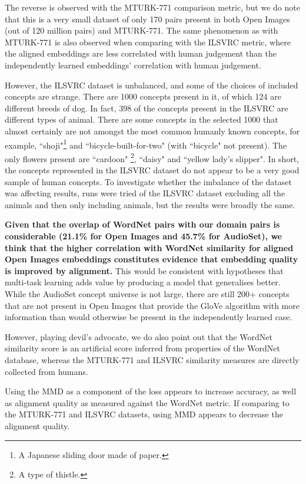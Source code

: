 The reverse is observed with the MTURK-771 comparison metric, but we do note that this is a very small dataset of only 170 pairs present in both Open Images (out of 120 million pairs) and MTURK-771. The same phenomenon as with MTURK-771 is also observed when comparing with the ILSVRC metric, where the aligned embeddings are less correlated with human judgement than the independently learned embeddings' correlation with human judgement. 

However, the ILSVRC dataset is unbalanced, and some of the choices of included concepts are strange. There are 1000 concepts present in it, of which 124 are different breeds of dog. In fact, 398 of the concepts present in the ILSVRC are different types of animal. There are some concepts in the selected 1000 that almost certainly are not amongst the most common humanly known concepts, for example, ``shoji"\footnote{A Japanese sliding door made of paper.} and ``bicycle-built-for-two" (with ``bicycle" not present). The only flowers present are ``cardoon" \footnote{A type of thistle.}, ``daisy" and ``yellow lady's slipper". In short, the concepts represented in the ILSVRC dataset do not appear to be a very good sample of human concepts. To investigate whether the imbalance of the dataset was affecting results, runs were tried of the ILSVRC dataset excluding all the animals and then only including animals, but the results were broadly the same. 

\textbf{Given that the overlap of WordNet pairs with our domain pairs is considerable (21.1\% for Open Images and 45.7\% for AudioSet), we think that the higher correlation with WordNet similarity for aligned Open Images embeddings constitutes evidence that embedding quality is improved by alignment.} This would be consistent with hypotheses that multi-task learning adds value by producing a model that generalises better. While the AudioSet concept universe is not large, there are still 200+ concepts that are not present in Open Images that provide the GloVe algorithm with more information than would otherwise be present in the independently learned case. 

However, playing devil's advocate, we do also point out that the WordNet similarity score is an artificial score inferred from properties of the WordNet database, whereas the MTURK-771 and  ILSVRC similarity measures are directly collected from humans. 

Using the MMD as a component of the loss appears to increase accuracy, as well as alignment quality as measured against the WordNet metric. If comparing to the MTURK-771 and ILSVRC datasets, using MMD appears to decrease the alignment quality.  
\newpage
